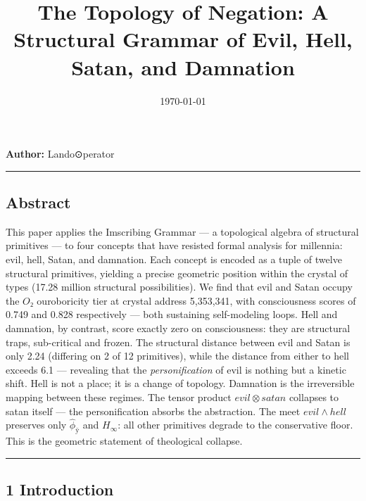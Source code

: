 \documentclass[12pt,a4paper]{article}
\begin{document}
\title{The Topology of Negation: A Structural Grammar of Evil, Hell, Satan, and Damnation}
\date{\today}

\maketitle

\textbf{Author:} Lando\otimes⊙perator

\begin{center}
\rule{0.5\textwidth}{0.4pt}
\end{center}

\subsection{Abstract}

This paper applies the Imscribing Grammar --- a topological algebra of structural primitives --- to four concepts that have resisted formal analysis for millennia: evil, hell, Satan, and damnation. Each concept is encoded as a tuple of twelve structural primitives, yielding a precise geometric position within the crystal of types (17.28 million structural possibilities). We find that evil and Satan occupy the $O₂$ ouroboricity tier at crystal address 5,353,341, with consciousness scores of 0.749 and 0.828 respectively --- both sustaining self-modeling loops. Hell and damnation, by contrast, score exactly zero on consciousness: they are structural traps, sub-critical and frozen. The structural distance between evil and Satan is only 2.24 (differing on 2 of 12 primitives), while the distance from either to hell exceeds 6.1 --- revealing that the \emph{personification} of evil is nothing but a kinetic shift. Hell is not a place; it is a change of topology. Damnation is the irreversible mapping between these regimes. The tensor product ${evil} \otimes {satan}$ collapses to satan itself --- the personification absorbs the abstraction. The meet ${evil} \wedge {hell}$ preserves only $\hat{\phi}_{ÿ}$ and $H_{\infty}$: all other primitives degrade to the conservative floor. This is the geometric statement of theological collapse.

\begin{center}
\rule{0.5\textwidth}{0.4pt}
\end{center}

\subsection{1 Introduction}
\end{document}
